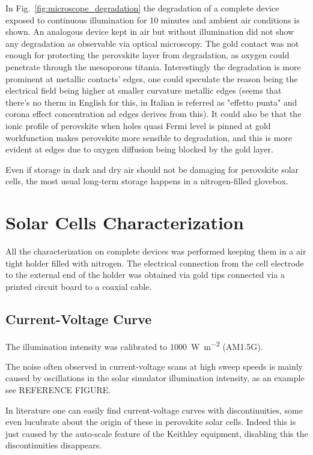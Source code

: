 		In Fig.~\ref{fig:microscope_degradation} the degradation of a complete device exposed to continuous illumination for 10 minutes and ambient air conditions is shown. An analogous device kept in air but without illumination did not show any degradation as observable via optical microscopy. The gold contact was not enough for protecting the perovskite layer from degradation, as oxygen could penetrate through the mesoporous titania. Interestingly the degradation is more prominent at metallic contacts' edges, one could speculate the reason being the electrical field being higher at smaller curvature metallic edges (seems that there's no therm in English for this, in Italian is referred as "effetto punta" and corona effect concentration ad edges derives from this). It could also be that the ionic profile of perovskite when holes quasi Fermi level is pinned at gold workfunction makes perovskite more sensible to degradation, and this is more evident at edges due to oxygen diffusion being blocked by the gold layer.

		Even if storage in dark and dry air should not be damaging for perovskite solar cells, the most usual long-term storage happens in a nitrogen-filled glovebox.

\section{Solar Cells Characterization}

	All the characterization on complete devices was performed keeping them in a air tight holder filled with nitrogen. The electrical connection from the cell electrode to the external end of the holder was obtained via gold tips connected via a printed circuit board to a coaxial cable.

	\subsection{Current-Voltage Curve}

		The illumination intensity was calibrated to \SI{1000}{\W\per\square\m} (AM1.5G).
		
		The noise often observed in current-voltage scans at high sweep speeds is mainly caused by oscillations in the solar simulator illumination intensity, as an example see REFERENCE FIGURE.
		
		In literature one can easily find current-voltage curves with discontinuities, some even lucubrate about the origin of these in perovskite solar cells. Indeed this is just caused by the auto-scale feature of the Keithley equipment, disabling this the discontinuities disappears.
		
